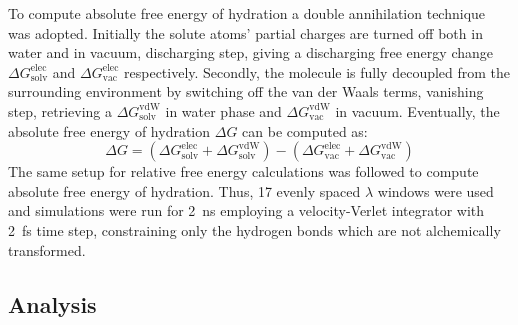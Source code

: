 \documentclass[journal=jctcce,manuscript=article]{achemso}
\begin{document}
To compute absolute free energy of hydration a double annihilation 
technique~\cite{jorgensen1988efficient,GILSON19971047,Bosisio2016}
was adopted. 
Initially the solute atoms' partial charges are turned off both in water and in 
vacuum, discharging step, giving a discharging
free energy change $\Delta G_\mathrm{solv}^\mathrm{elec}$ and $\Delta 
G_\mathrm{vac}^\mathrm{elec}$ respectively. Secondly,
the molecule is fully decoupled from the surrounding environment by switching 
off the van der Waals terms, vanishing step, retrieving a $\Delta 
G_\mathrm{solv}^\mathrm{vdW}$ in water phase and $\Delta 
G_\mathrm{vac}^\mathrm{vdW}$ in vacuum. 
Eventually, the absolute free energy of hydration $\Delta G$ can be computed as:
\begin{equation}
\label{eq:absolutehyd}
\Delta G = (\Delta G_\mathrm{solv}^\mathrm{elec} + \Delta 
G_\mathrm{solv}^\mathrm{vdW}) - (\Delta G_\mathrm{vac}^\mathrm{elec} + \Delta 
G_\mathrm{vac}^\mathrm{vdW})
\end{equation}
The same setup for relative free energy calculations was followed to compute 
absolute free energy of hydration. Thus, 17 evenly spaced $\lambda$ windows 
were used and simulations were run for \SI{2}{ns} employing a velocity-Verlet 
integrator with \SI{2}{fs} time step, constraining only the hydrogen bonds 
which are not alchemically transformed. 


\subsection{Analysis}
\label{sec:analysis}
\end{document}
